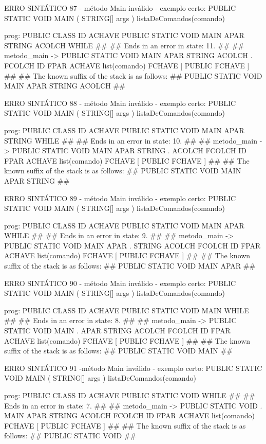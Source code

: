 \documentclass[12pt,a4paper,twoside]{report}
\begin{document}
\begin{terminal}
{ERRO SINTÁTICO 87 - método Main inválido -  exemplo certo: PUBLIC STATIC VOID MAIN ( STRING[] args ){  listaDeComandos(comando) }

prog: PUBLIC CLASS ID ACHAVE PUBLIC STATIC VOID MAIN APAR STRING ACOLCH WHILE 
##
## Ends in an error in state: 11.
##
## metodo_main -> PUBLIC STATIC VOID MAIN APAR STRING ACOLCH . FCOLCH ID FPAR ACHAVE list(comando) FCHAVE [ PUBLIC FCHAVE ]
##
## The known suffix of the stack is as follows:
## PUBLIC STATIC VOID MAIN APAR STRING ACOLCH 
##

ERRO SINTÁTICO 88 - método Main inválido -  exemplo certo: PUBLIC STATIC VOID MAIN ( STRING[] args ){  listaDeComandos(comando) }

prog: PUBLIC CLASS ID ACHAVE PUBLIC STATIC VOID MAIN APAR STRING WHILE 
##
## Ends in an error in state: 10.
##
## metodo_main -> PUBLIC STATIC VOID MAIN APAR STRING . ACOLCH FCOLCH ID FPAR ACHAVE list(comando) FCHAVE [ PUBLIC FCHAVE ]
##
## The known suffix of the stack is as follows:
## PUBLIC STATIC VOID MAIN APAR STRING 
##

ERRO SINTÁTICO 89 - método Main inválido -  exemplo certo: PUBLIC STATIC VOID MAIN ( STRING[] args ){  listaDeComandos(comando) }

prog: PUBLIC CLASS ID ACHAVE PUBLIC STATIC VOID MAIN APAR WHILE 
##
## Ends in an error in state: 9.
##
## metodo_main -> PUBLIC STATIC VOID MAIN APAR . STRING ACOLCH FCOLCH ID FPAR ACHAVE list(comando) FCHAVE [ PUBLIC FCHAVE ]
##
## The known suffix of the stack is as follows:
## PUBLIC STATIC VOID MAIN APAR 
##

ERRO SINTÁTICO 90 - método Main inválido -  exemplo certo: PUBLIC STATIC VOID MAIN ( STRING[] args ){  listaDeComandos(comando) }

prog: PUBLIC CLASS ID ACHAVE PUBLIC STATIC VOID MAIN WHILE 
##
## Ends in an error in state: 8.
##
## metodo_main -> PUBLIC STATIC VOID MAIN . APAR STRING ACOLCH FCOLCH ID FPAR ACHAVE list(comando) FCHAVE [ PUBLIC FCHAVE ]
##
## The known suffix of the stack is as follows:
## PUBLIC STATIC VOID MAIN 
##

ERRO SINTÁTICO 91 -método Main inválido - exemplo certo: PUBLIC STATIC VOID MAIN ( STRING[] args ){  listaDeComandos(comando) }

prog: PUBLIC CLASS ID ACHAVE PUBLIC STATIC VOID WHILE 
##
## Ends in an error in state: 7.
##
## metodo_main -> PUBLIC STATIC VOID . MAIN APAR STRING ACOLCH FCOLCH ID FPAR ACHAVE list(comando) FCHAVE [ PUBLIC FCHAVE ]
##
## The known suffix of the stack is as follows:
## PUBLIC STATIC VOID 
##

}
\end{terminal}
\end{document}
